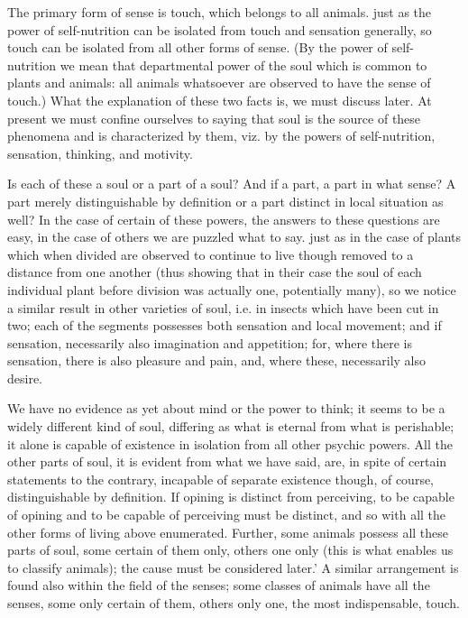 The primary form of sense is touch, which belongs to all animals.
just as the power of self-nutrition can be isolated from touch and
sensation generally, so touch can be isolated from all other forms
of sense. (By the power of self-nutrition we mean that departmental
power of the soul which is common to plants and animals: all animals
whatsoever are observed to have the sense of touch.) What the explanation
of these two facts is, we must discuss later. At present we must confine
ourselves to saying that soul is the source of these phenomena and
is characterized by them, viz. by the powers of self-nutrition, sensation,
thinking, and motivity. 

Is each of these a soul or a part of a soul? And if a part, a part
in what sense? A part merely distinguishable by definition or a part
distinct in local situation as well? In the case of certain of these
powers, the answers to these questions are easy, in the case of others
we are puzzled what to say. just as in the case of plants which when
divided are observed to continue to live though removed to a distance
from one another (thus showing that in their case the soul of each
individual plant before division was actually one, potentially many),
so we notice a similar result in other varieties of soul, i.e. in
insects which have been cut in two; each of the segments possesses
both sensation and local movement; and if sensation, necessarily also
imagination and appetition; for, where there is sensation, there is
also pleasure and pain, and, where these, necessarily also desire.

We have no evidence as yet about mind or the power to think; it seems
to be a widely different kind of soul, differing as what is eternal
from what is perishable; it alone is capable of existence in isolation
from all other psychic powers. All the other parts of soul, it is
evident from what we have said, are, in spite of certain statements
to the contrary, incapable of separate existence though, of course,
distinguishable by definition. If opining is distinct from perceiving,
to be capable of opining and to be capable of perceiving must be distinct,
and so with all the other forms of living above enumerated. Further,
some animals possess all these parts of soul, some certain of them
only, others one only (this is what enables us to classify animals);
the cause must be considered later.' A similar arrangement is found
also within the field of the senses; some classes of animals have
all the senses, some only certain of them, others only one, the most
indispensable, touch. 

